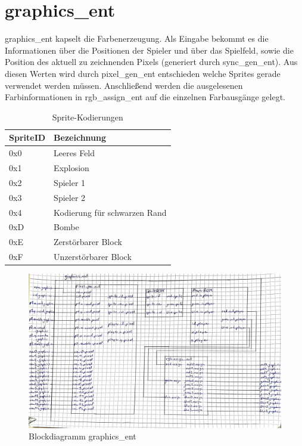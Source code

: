 \documentclass[parskip=full]{scrartcl}
\begin{document}
		\section{graphics\_ent}
			graphics\_ent kapselt die Farbenerzeugung. Als Eingabe bekommt es die Informationen über die Positionen der Spieler und über das Spielfeld, sowie die Position des aktuell zu zeichnenden Pixels (generiert durch sync\_gen\_ent). Aus diesen Werten wird durch pixel\_gen\_ent entschieden welche Sprites gerade verwendet werden müssen. Anschließend werden die ausgelesenen Farbinformationen in rgb\_assign\_ent auf die einzelnen Farbausgänge gelegt.\newline
			
			\begin{table}[H]
				\centering
				\label{spriteCode}
				\begin{tabular}{|l|l|}
					\hline
					\textbf{SpriteID} & \textbf{Bezeichnung}      \\ \hline
					0x0           & Leeres Feld               \\ \hline
					0x1           & Explosion                 \\ \hline
					0x2           & Spieler 1                 \\ \hline
					0x3           & Spieler 2                 \\ \hline
					0x4           & Kodierung für schwarzen Rand \\ \hline
					0xD           & Bombe                     \\ \hline
					0xE           & Zerstörbarer Block        \\ \hline
					0xF           & Unzerstörbarer Block      \\ \hline
				\end{tabular}
				\caption{Sprite-Kodierungen}
			\end{table}
		
			\begin{figure}[H]
				\centering
				\includegraphics[angle=90,scale=0.1]{./bilder/graphics_ent.jpg}
				\caption{Blockdiagramm graphics\_ent}
			\end{figure}
			
\end{document}
